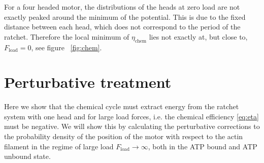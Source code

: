 \documentclass[aps,pre,twocolumn,showpacs,showkeys,superscriptaddress,floatfix]{revtex4-1}
\begin{document}
For a four headed motor, the distributions of the heads at zero load are not exactly peaked around the minimum of the potential. 
This is due to the fixed distance between each head, which does not correspond to the period of the ratchet. 
Therefore the local minimum of $\eta_\text{chem}$ lies not exactly at, but close to, $F_\text{load} =0$, see figure ~\ref{fig:chem}.



\section{Perturbative treatment}
\label{sec:perturb}
Here we show that the chemical cycle must extract energy from the ratchet system with one head and for large load forces, 
i.e. the chemical efficiency \eqref{eq:eta} must be negative. 
We will show this by calculating the perturbative corrections to the probability density of the position of the motor with respect to the actin filament in the regime of large load $F_\text{load} \to \infty$, both in the ATP bound and ATP unbound state. 
\end{document}
